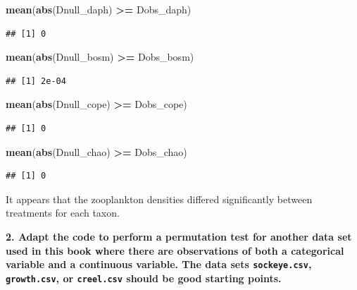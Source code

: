 \documentclass[]{book}
\newenvironment{Shaded}{\begin{snugshade}}{\end{snugshade}}
\newcommand{\KeywordTok}[1]{\textcolor[rgb]{0.13,0.29,0.53}{\textbf{#1}}}
\newcommand{\NormalTok}[1]{#1}
\newcommand{\OperatorTok}[1]{\textcolor[rgb]{0.81,0.36,0.00}{\textbf{#1}}}
\newcommand{\StringTok}[1]{\textcolor[rgb]{0.31,0.60,0.02}{#1}}
\begin{document}
\begin{Shaded}
\begin{Highlighting}[]
\KeywordTok{mean}\NormalTok{(}\KeywordTok{abs}\NormalTok{(Dnull_daph) }\OperatorTok{>=}\StringTok{ }\NormalTok{Dobs_daph)}
\end{Highlighting}
\end{Shaded}

\begin{verbatim}
## [1] 0
\end{verbatim}

\begin{Shaded}
\begin{Highlighting}[]
\KeywordTok{mean}\NormalTok{(}\KeywordTok{abs}\NormalTok{(Dnull_bosm) }\OperatorTok{>=}\StringTok{ }\NormalTok{Dobs_bosm)}
\end{Highlighting}
\end{Shaded}

\begin{verbatim}
## [1] 2e-04
\end{verbatim}

\begin{Shaded}
\begin{Highlighting}[]
\KeywordTok{mean}\NormalTok{(}\KeywordTok{abs}\NormalTok{(Dnull_cope) }\OperatorTok{>=}\StringTok{ }\NormalTok{Dobs_cope)}
\end{Highlighting}
\end{Shaded}

\begin{verbatim}
## [1] 0
\end{verbatim}

\begin{Shaded}
\begin{Highlighting}[]
\KeywordTok{mean}\NormalTok{(}\KeywordTok{abs}\NormalTok{(Dnull_chao) }\OperatorTok{>=}\StringTok{ }\NormalTok{Dobs_chao)}
\end{Highlighting}
\end{Shaded}

\begin{verbatim}
## [1] 0
\end{verbatim}

It appears that the zooplankton densities differed significantly between treatments for each taxon.

\textbf{2. Adapt the code to perform a permutation test for another data set used in this book where there are observations of both a categorical variable and a continuous variable. The data sets \texttt{sockeye.csv}, \texttt{growth.csv}, or \texttt{creel.csv} should be good starting points.}
\end{document}
